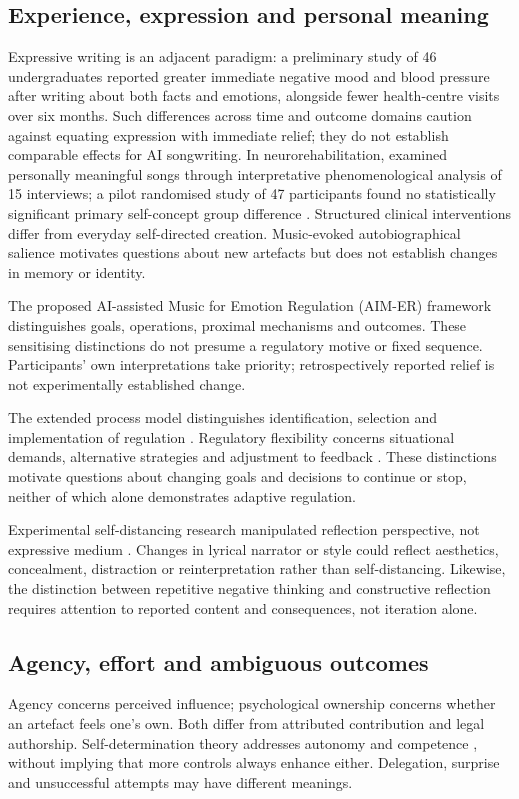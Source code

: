 \subsection{Experience, expression and personal meaning}
Expressive writing \citep{pennebaker1986} is an adjacent paradigm: a preliminary study of 46 undergraduates reported greater immediate negative mood and blood pressure after writing about both facts and emotions, alongside fewer health-centre visits over six months. Such differences across time and outcome domains caution against equating expression with immediate relief; they do not establish comparable effects for AI songwriting. In neurorehabilitation, \citet{baker2018} examined personally meaningful songs through interpretative phenomenological analysis of 15 interviews; a pilot randomised study of 47 participants found no statistically significant primary self-concept group difference \citep{baker2019}. Structured clinical interventions differ from everyday self-directed creation. Music-evoked autobiographical salience \citep{janata2009} motivates questions about new artefacts but does not establish changes in memory or identity.

The proposed AI-assisted Music for Emotion Regulation (AIM-ER) framework distinguishes goals, operations, proximal mechanisms and outcomes. These sensitising distinctions do not presume a regulatory motive or fixed sequence. Participants' own interpretations take priority; retrospectively reported relief is not experimentally established change.

The extended process model distinguishes identification, selection and implementation of regulation \citep{gross2015}. Regulatory flexibility concerns situational demands, alternative strategies and adjustment to feedback \citep{bonanno2013}. These distinctions motivate questions about changing goals and decisions to continue or stop, neither of which alone demonstrates adaptive regulation.

Experimental self-distancing research manipulated reflection perspective, not expressive medium \citep{kross2011}. Changes in lyrical narrator or style could reflect aesthetics, concealment, distraction or reinterpretation rather than self-distancing. Likewise, the distinction between repetitive negative thinking and constructive reflection \citep{nolen2008} requires attention to reported content and consequences, not iteration alone.

\subsection{Agency, effort and ambiguous outcomes}
Agency concerns perceived influence; psychological ownership concerns whether an artefact feels one's own. Both differ from attributed contribution and legal authorship. Self-determination theory addresses autonomy and competence \citep{ryan2000}, without implying that more controls always enhance either. Delegation, surprise and unsuccessful attempts may have different meanings.

